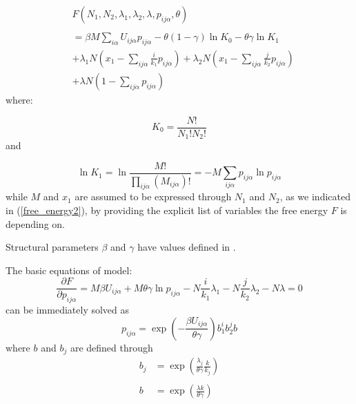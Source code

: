 \documentclass[12pt,abstract]{scrartcl}
\begin{document}
\begin{equation} \label{free_energy2}
\begin{split}
   & F (N_1, N_2, \lambda_1, \lambda_2, \lambda, p_{i j \alpha}, \theta)  \\
\\
&= \beta M \sum_{i\alpha} U_{i j \alpha} p_{i j \alpha} - \theta(1- \gamma) \ln K_0 - \theta \gamma \ln K_1\\ 
&+ \lambda_1 N \left(x_1 - \sum_{i j \alpha}\frac{i}{k_1} p_{i j \alpha} \right) 
+ \lambda_2 N \left(x_1 - \sum_{i j \alpha} \frac{j}{k_2} p_{i j \alpha}   \right) \\ 
&+ \lambda N \left(1- \sum_{i j \alpha}p_{i j \alpha}   \right)
\end{split}
\end{equation}
where:


\begin{equation} \label{bragg2}
K_0 = \frac{N!}{N_1! N_2! }
\end{equation}
and


\begin{equation} \label{K12}
\ln K_1 = \ln \frac{M!}{\prod\limits_{i j \alpha} ( M_{i j \alpha})!} = - M \sum_{i j \alpha} p_{i j \alpha} \ln p_{i j \alpha}
\end{equation}
while  $M$ and $x_1$ are assumed to be expressed through $N_1$ and $N_2$, as we indicated in (\ref{free_energy2}), by providing the  explicit list of  variables the free energy $F$ is depending on.


Structural parameters \( \beta \) and \( \gamma \) have values defined in \cite{TISR_p1, TISR_p4}.

The basic equations of model:
\begin{equation} \label{basic_equation2}
    \frac{\partial F}{\partial p_{i j \alpha}} = M \beta U_{i j \alpha} + M \theta \gamma \ln p_{i j \alpha} 
- N \frac{i}{k_1} \lambda_1 - N \frac{j}{k_2} \lambda_2 - N \lambda = 0 
\end{equation}
can be immediately solved as
\begin{equation} \label{pia2}
    p_{i j \alpha} = \exp \left(- {\frac{\beta U_{i j \alpha}}{\theta\gamma }}\right) b_1^i b_2^j b
\end{equation}
where $b$ and $b_j$ are defined through
\begin{equation}
\begin{split}
b_j & = \exp \left( \frac{\lambda_j}{\theta \gamma} \frac{k}{k_j} \right)\\
\\
b & =  \exp \left( \frac{\lambda k}{\theta \gamma} \right)
\end{split}
\end{equation}
\end{document}
